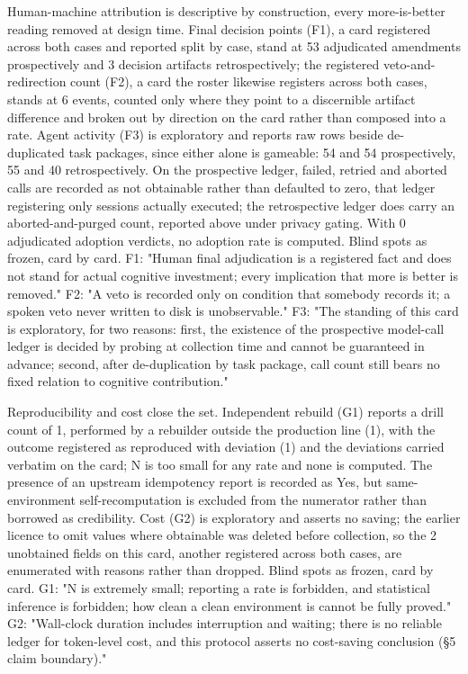 \documentclass[
  english,
]{article}
\begin{document}
Human-machine attribution is descriptive by construction, every more-is-better reading removed at design time. Final decision points (F1), a card registered across both cases and reported split by case, stand at 53 adjudicated amendments prospectively and 3 decision artifacts retrospectively; the registered veto-and-redirection count (F2), a card the roster likewise registers across both cases, stands at 6 events, counted only where they point to a discernible artifact difference and broken out by direction on the card rather than composed into a rate. Agent activity (F3) is exploratory and reports raw rows beside de-duplicated task packages, since either alone is gameable: 54 and 54 prospectively, 55 and 40 retrospectively. On the prospective ledger, failed, retried and aborted calls are recorded as not obtainable rather than defaulted to zero, that ledger registering only sessions actually executed; the retrospective ledger does carry an aborted-and-purged count, reported above under privacy gating. With 0 adjudicated adoption verdicts, no adoption rate is computed. Blind spots as frozen, card by card. F1: "Human final adjudication is a registered fact and does not stand for actual cognitive investment; every implication that more is better is removed." F2: "A veto is recorded only on condition that somebody records it; a spoken veto never written to disk is unobservable." F3: "The standing of this card is exploratory, for two reasons: first, the existence of the prospective model-call ledger is decided by probing at collection time and cannot be guaranteed in advance; second, after de-duplication by task package, call count still bears no fixed relation to cognitive contribution."

Reproducibility and cost close the set. Independent rebuild (G1) reports a drill count of 1, performed by a rebuilder outside the production line (1), with the outcome registered as reproduced with deviation (1) and the deviations carried verbatim on the card; N is too small for any rate and none is computed. The presence of an upstream idempotency report is recorded as Yes, but same-environment self-recomputation is excluded from the numerator rather than borrowed as credibility. Cost (G2) is exploratory and asserts no saving; the earlier licence to omit values where obtainable was deleted before collection, so the 2 unobtained fields on this card, another registered across both cases, are enumerated with reasons rather than dropped. Blind spots as frozen, card by card. G1: "N is extremely small; reporting a rate is forbidden, and statistical inference is forbidden; how clean a clean environment is cannot be fully proved." G2: "Wall-clock duration includes interruption and waiting; there is no reliable ledger for token-level cost, and this protocol asserts no cost-saving conclusion (§5 claim boundary)."
\end{document}
